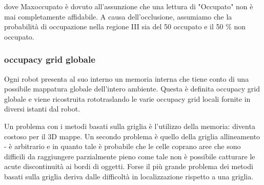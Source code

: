 dove Maxoccupato è dovuto all'assunzione che una lettura di "Occupato" non è mai completamente
affidabile.
A causa dell'occlusione, assumiamo che la probabilità di occupazione nella regione III sia del 50%
occupato e il 50 $\%$ non occupato.

\subsubsection{occupacy grid globale}
Ogni robot presenta al suo interno un memoria interna che tiene conto di una possibile mappatura globale dell'intero ambiente. Questa è definita occupacy grid globale e viene ricostruita rototraslando le varie occupacy grid locali fornite in diversi istanti dal robot.

Un problema con i metodi basati sulla griglia è l'utilizzo della memoria: diventa costoso per il 3D
mappe. Un secondo problema è quello della griglia allineamento - è arbitrario e in quanto tale è probabile che le celle coprano aree che sono difficili da raggiungere parzialmente pieno come tale non è possibile catturare le acute discontinuità ai bordi di oggetti. Forse il più grande problema dei metodi basati sulla griglia deriva dalle difficoltà in localizzazione rispetto a una griglia.
